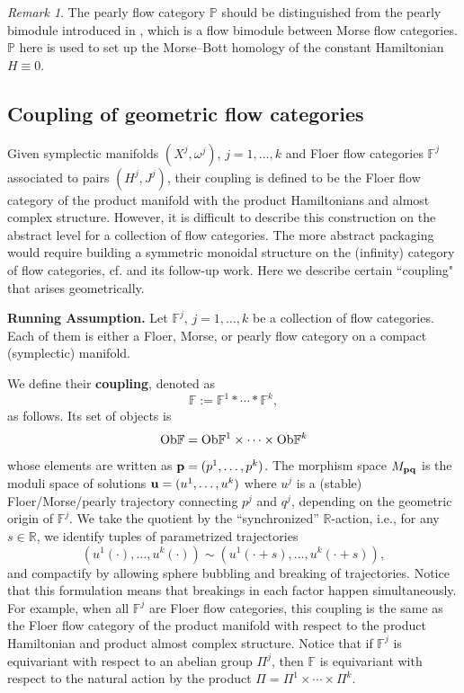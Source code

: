 \documentclass[reqno, 10pt]{amsart}
\numberwithin{equation}{section}
\numberwithin{equation}{section}
\theoremstyle{definition}
\theoremstyle{remark}
\newtheorem{rem}[thm]{Remark}
\newcommand{\beqn}{\begin{equation*}}
\newcommand{\eeqn}{\end{equation*}}
\newcommand{\mb}{\mathbb}
\begin{document}
\begin{rem}
    The pearly flow category $\mb{P}$ should be distinguished from the pearly bimodule introduced in \cite[Section 4.4]{Bai_Xu_Arnold}, which is a flow bimodule between Morse flow categories. $\mb{P}$ here is used to set up the Morse--Bott homology of the constant Hamiltonian $H \equiv 0$.
\end{rem}



\subsection{Coupling of geometric flow categories}

Given symplectic manifolds $(X^j, \omega^j)$, $j = 1, \ldots, k$ and Floer flow categories $\mb{F}^j$ associated to pairs $(H^j, J^j)$, their coupling is defined to be the Floer flow category of the product manifold with the product Hamiltonians and almost complex structure. However, it is difficult to describe this construction on the abstract level for a collection of flow categories. The more abstract packaging would require building a symmetric monoidal structure on the (infinity) category of flow categories, cf. \cite{Abouzaid_Blumberg_2024} and its follow-up work. Here we describe certain ``coupling" that arises geometrically. 

{\bf Running Assumption.} Let $\mb{F}^j$, $j = 1, \ldots, k$ be a collection of flow categories. Each of them is either a Floer, Morse, or pearly flow category on a compact (symplectic) manifold.

We define their {\bf coupling}, denoted as
\beqn
{\mb F}:= {\mb F}^1 \ast \cdots \ast {\mb F}^k,
\eeqn
as follows. Its set of objects is
\beqn
{\rm Ob} {\mb F} = {\rm Ob}{\mb F}^1 \times \cdots \times {\rm Ob}{\mb F}^k
\eeqn
whose elements are written as ${\bf p} = (p^1, \ldots, p^k)$. The morphism space $M_{{\bf p}{\bf q}}$ is the moduli space of solutions ${\bf u} = (u^1, \ldots, u^k)$ where $u^j$ is a (stable) Floer/Morse/pearly trajectory connecting $p^j$ and $q^j$, depending on the geometric origin of $\mb{F}^j$. We take the quotient by the ``synchronized'' ${\mb R}$-action, i.e., for any $s \in {\mb R}$, we identify tuples of parametrized trajectories
\beqn
(u^1 (\cdot), \dots, u^k(\cdot)) \sim (u^1 (\cdot + s), \dots, u^k(\cdot + s)),
\eeqn
and compactify by allowing sphere bubbling and breaking of trajectories. Notice that this formulation means that breakings in each factor happen simultaneously. For example, when all ${\mb F}^j$ are Floer flow categories, this coupling is the same as the Floer flow category of the product manifold with respect to the product Hamiltonian and product almost complex structure. Notice that if ${\mb F}^j$ is equivariant with respect to an abelian group $\Pi^j$, then ${\mb F}$ is equivariant with respect to the natural action by the product $\Pi = \Pi^1 \times \cdots \times \Pi^k$.
\end{document}
